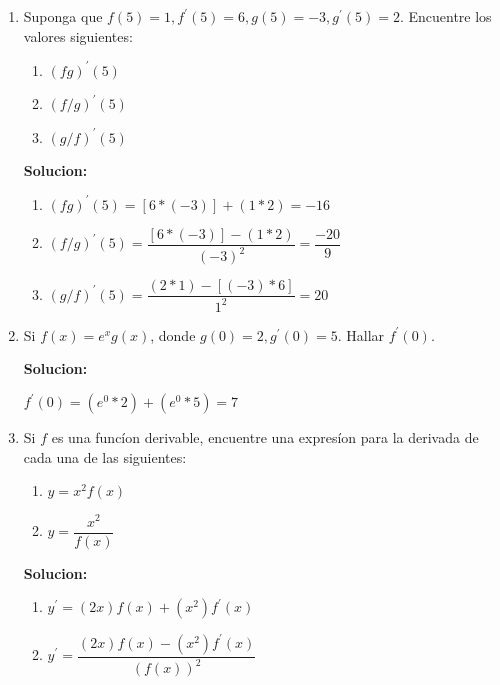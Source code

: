 \documentclass{article}
\begin{document}
\begin{enumerate}[start=5, label=\textbf{\arabic*.}]
    \item Suponga que $f(5) = 1, f^{\prime}(5) = 6, g(5) = -3, g^{\prime}(5) = 2$. Encuentre los valores siguientes:
        \begin{enumerate}[label=\alph*)] %
            \item $(fg)^{\prime}(5)$
            \item $(f/g)^{\prime}(5)$
            \item $(g/f)^{\prime}(5)$
        \end{enumerate}
        \vspace{0.5em}
        
    \textbf{Solucion: }

    \begin{enumerate}[label=\alph*)] 
        \item $(fg)^{\prime}(5)= [6*(-3)] + (1*2) = -16$
        \item $(f/g)^{\prime}(5) = \dfrac {[6*(-3)] - (1*2)}{(-3)^2} = \dfrac{-20}{9}$
        \item $(g/f)^{\prime}(5) = \dfrac{(2*1) - [(-3)*6]}{1^2} = {20}$
        \vspace{0.5em}
    \end{enumerate}

    \item Si $f(x) = e^x g(x)$, donde $g(0) = 2, g^{\prime}(0) = 5$. Hallar $f^{\prime}(0)$.
    \vspace{0.5em}
    \vspace{0.5em}

    \textbf{Solucion: }

    $f^{\prime}(0) =  (e^0*2) + (e^0*5) = 7$
    \vspace{0.5em}
    \item Si $f$ es una funcíon derivable, encuentre una expresíon para la derivada de cada una de las siguientes:
    \begin{enumerate}[label=\alph*)]
        \item $y = x^2f(x)$
        \item $y = \dfrac{x^2}{f(x)}$
    \end{enumerate}

    \textbf{Solucion: }
    \begin{enumerate}[label=\alph*)]
        \item $y^{\prime} = (2x)f(x) + (x^2)f^{\prime}(x)$
        \item $y^{\prime} = \dfrac{(2x)f(x) - (x^2)f^{\prime}(x)}{(f(x))^2}$
    \end{enumerate}
    \vspace{0.5em}
    

\end{enumerate}
\end{document}
